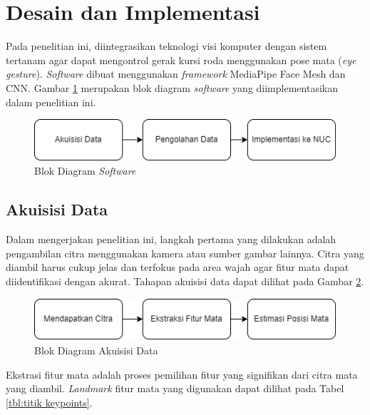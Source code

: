 \section{Desain dan Implementasi}
\label{sec:desaindanimplementasi}

Pada penelitian ini, diintegrasikan teknologi visi komputer dengan sistem tertanam agar dapat mengontrol gerak kursi roda menggunakan pose mata (\emph{eye gesture}). \emph{Software} dibuat menggunakan \emph{framework} MediaPipe Face Mesh dan CNN. Gambar \ref{fig:sistem} merupakan blok diagram \emph{software} yang diimplementasikan dalam penelitian ini.

\begin{figure} [ht] \centering
  \includegraphics[scale=0.55]{gambar/paper1.png}
  \caption{Blok Diagram \emph{Software}}
  \label{fig:sistem}
\end{figure}

\subsection{Akuisisi Data}

Dalam mengerjakan penelitian ini, langkah pertama yang dilakukan adalah pengambilan citra menggunakan kamera atau sumber gambar lainnya. Citra yang diambil harus cukup jelas dan terfokus pada area wajah agar fitur mata dapat diidentifikasi dengan akurat. Tahapan akuisisi data dapat dilihat pada Gambar \ref{fig:akuisisi}.

\begin{figure} [H] \centering
  \includegraphics[scale=0.55]{gambar/paper2.png}
  \caption{Blok Diagram Akuisisi Data}
  \label{fig:akuisisi}
\end{figure}

Ekstrasi fitur mata adalah proses pemilihan fitur yang signifikan dari citra mata yang diambil. \emph{Landmark} fitur mata yang digunakan dapat dilihat pada Tabel \ref{tbl:titik keypoints}.

